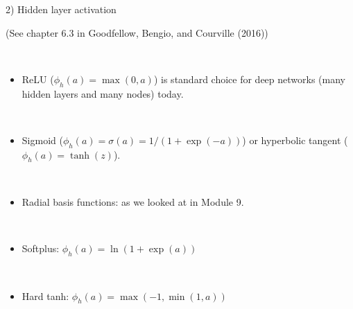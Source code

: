 \documentclass[10pt,ignorenonframetext,]{beamer}
\providecommand{\tightlist}{%
  \setlength{\itemsep}{0pt}\setlength{\parskip}{0pt}}
\begin{document}
\begin{frame}

\begin{block}{2) Hidden layer activation}

\tiny

(See chapter 6.3 in Goodfellow, Bengio, and Courville (2016))

\normalsize

\(~\)

\begin{itemize}
\tightlist
\item
  ReLU (\(\phi_h(a)=\max(0,a)\)) is standard choice for deep networks
  (many hidden layers and many nodes) today.
\end{itemize}

\(~\)

\begin{itemize}
\tightlist
\item
  Sigmoid (\(\phi_h(a)=\sigma(a)=1/(1+\exp(-a))\)) or hyperbolic tangent
  (\(\phi_h(a)=\tanh(z)\)).
\end{itemize}

\(~\)

\begin{itemize}
\tightlist
\item
  Radial basis functions: as we looked at in Module 9.
\end{itemize}

\(~\)

\begin{itemize}
\tightlist
\item
  Softplus: \(\phi_h(a)=\ln(1+\exp(a))\)
\end{itemize}

\(~\)

\begin{itemize}
\tightlist
\item
  Hard tanh: \(\phi_h(a)=\max(-1,\min(1,a))\)
\end{itemize}

\end{block}

\end{frame}
\end{document}
